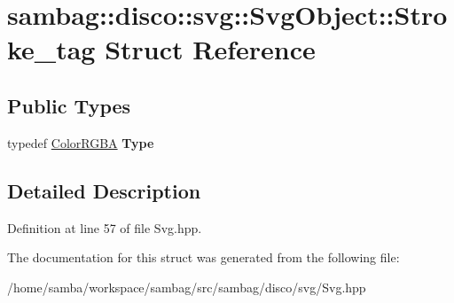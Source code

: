 \hypertarget{structsambag_1_1disco_1_1svg_1_1_svg_object_1_1_stroke__tag}{
\section{sambag::disco::svg::SvgObject::Stroke\_\-tag Struct Reference}
\label{structsambag_1_1disco_1_1svg_1_1_svg_object_1_1_stroke__tag}
}
\subsection*{Public Types}
\begin{DoxyCompactItemize}
\item 
\hypertarget{structsambag_1_1disco_1_1svg_1_1_svg_object_1_1_stroke__tag_ac954a56f9d35f99d8170aff10cde2573}{
typedef \hyperlink{structsambag_1_1com_1_1_color_r_g_b_a}{ColorRGBA} {\bfseries Type}}
\label{structsambag_1_1disco_1_1svg_1_1_svg_object_1_1_stroke__tag_ac954a56f9d35f99d8170aff10cde2573}

\end{DoxyCompactItemize}


\subsection{Detailed Description}


Definition at line 57 of file Svg.hpp.



The documentation for this struct was generated from the following file:\begin{DoxyCompactItemize}
\item 
/home/samba/workspace/sambag/src/sambag/disco/svg/Svg.hpp\end{DoxyCompactItemize}
